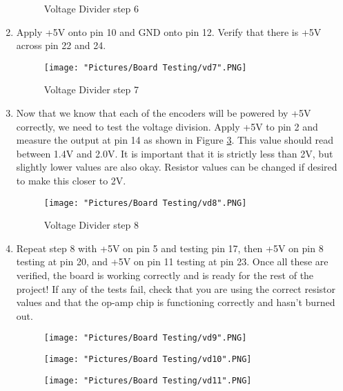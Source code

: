 \documentclass[12pt]{article}
\begin{document}
\begin{enumerate}
\begin{figure}[H]
		 	\caption{Voltage Divider step 6}
			\label{vd6}
		\end{figure}
	\item Apply +5V onto pin 10 and GND onto pin 12. Verify that there is +5V across pin 22 and 24.
		\begin{figure}[H]
		 	\centering
			\texttt{[image: "Pictures/Board Testing/vd7".PNG]}
		 	\caption{Voltage Divider step 7}
			\label{vd7}
		\end{figure}
	\item Now that we know that each of the encoders will be powered by +5V correctly, we need to test the voltage division. Apply +5V to pin 2 and measure the output at pin 14 as shown in Figure \ref{vd8}. This value should read between 1.4V and 2.0V. It is important that it is strictly less than 2V, but slightly lower values are also okay. Resistor values can be changed if desired to make this closer to 2V. 
		\begin{figure}[H]
		 	\centering
			\texttt{[image: "Pictures/Board Testing/vd8".PNG]}
		 	\caption{Voltage Divider step 8}
			\label{vd8}
		\end{figure}
	\item Repeat step 8 with +5V on pin 5 and testing pin 17, then +5V on pin 8 testing at pin 20, and +5V on pin 11 testing at pin 23. Once all these are verified, the board is working correctly and is ready for the rest of the project! If any of the tests fail, check that you are using the correct resistor values and that the op-amp chip is functioning correctly and hasn't burned out.  

	\begin{figure}[H]
	 	\centering
	  	\begin{minipage}[b]{0.45\textwidth}
			\texttt{[image: "Pictures/Board Testing/vd9".PNG]}
	  	\end{minipage}
	  	\hfill
	  	\begin{minipage}[b]{0.45\textwidth}
	    		\texttt{[image: "Pictures/Board Testing/vd10".PNG]}
	  	\end{minipage}
		\label{}
	\end{figure}


		\begin{figure}[H]
		 	\centering
			\texttt{[image: "Pictures/Board Testing/vd11".PNG]}
		 	\caption{}
			\label{vd11}
		\end{figure}

\end{enumerate}
\end{document}
